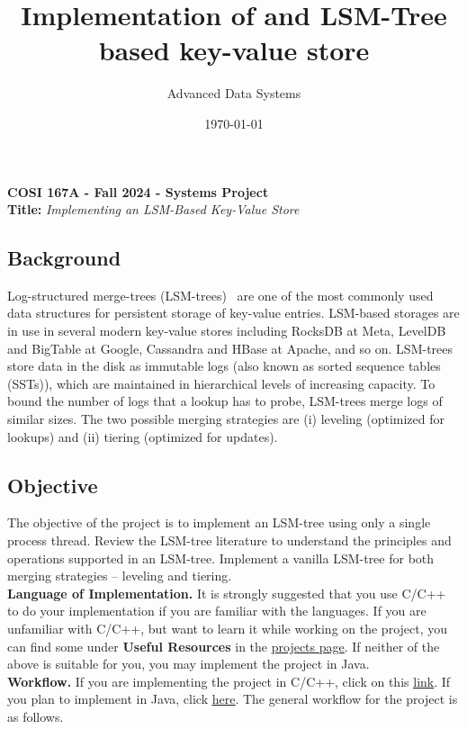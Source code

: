 \documentclass[12pt,a4paper,twoside]{article}
\title{Implementation of and LSM-Tree based key-value store}
\author{Advanced Data Systems}
\date{\today}
\begin{document}
\begin{center}
    {\textbf{COSI 167A - Fall 2024 - Systems Project}}\\
    {\textbf{Title: }\textit{Implementing an LSM-Based Key-Value Store}}
\end{center}


\normalsize
\subsection*{Background}
Log-structured merge-trees (LSM-trees)~\cite{CLMJLSM2020, NDMASIMONKEY2017, POECDGEJLSM1996} are one of the most commonly used data structures for persistent storage of key-value entries.
LSM-based storages are in use in several modern key-value stores including RocksDB at Meta, LevelDB and BigTable at Google, Cassandra and HBase at Apache, and so on.
LSM-trees store data in the disk as immutable logs (also known as sorted sequence tables (SSTs)), which are maintained in hierarchical levels of increasing capacity.
To bound the number of logs that a lookup has to probe, LSM-trees merge logs of similar sizes.
The two possible merging strategies are (i) leveling (optimized for lookups) and (ii) tiering (optimized for updates).

\subsection*{Objective}
The objective of the project is to implement an LSM-tree using only a single process thread. 
Review the LSM-tree literature to understand the principles and operations supported in an LSM-tree.
Implement a vanilla LSM-tree for both merging strategies -- leveling and tiering. \\

\noindent \textbf{Language of Implementation.} It is strongly suggested that you use C/C++ to do your implementation if you are familiar with the languages. 
If you are unfamiliar with C/C++, but want to learn it while working on the project, you can find some under \textbf{Useful Resources} in the \href{https://ssd-brandeis.github.io/COSI-167A/assignments/}{\underline{projects page}}. 
If neither of the above is suitable for you, you may implement the project in Java. \\ 

\noindent \textbf{Workflow.} If you are implementing the project in C/C++, click on this \href{https://github.com/SSD-Brandeis/LSMTree-DataStore-CPP}{\underline{link}}. 
If you plan to implement in Java, click \href{https://github.com/SSD-Brandeis/LSMTree-DataStore-Java}{\underline{here}}. 
The general workflow for the project is as follows.
\end{document}

